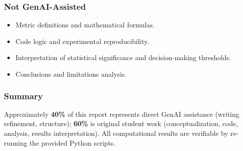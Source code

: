 \documentclass[conference]{IEEEtran}
\begin{document}
\subsubsection*{Not GenAI-Assisted}
\begin{itemize}
\item Metric definitions and mathematical formulas.
\item Code logic and experimental reproducibility.
\item Interpretation of statistical significance and decision-making thresholds.
\item Conclusions and limitations analysis.
\end{itemize}

\subsubsection*{Summary}
Approximately \textbf{40\%} of this report represents direct GenAI assistance (writing refinement, structure); \textbf{60\%} is original student work (conceptualization, code, analysis, results interpretation). All computational results are verifiable by re-running the provided Python scripts.



\end{document}
